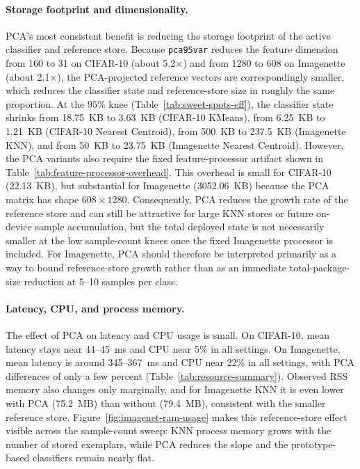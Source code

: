 \documentclass[sigconf,review,nonacm]{acmart}
\begin{document}
\paragraph{Storage footprint and dimensionality.}
PCA's most consistent benefit is reducing the storage footprint of the active classifier and reference store.
Because \texttt{pca95var} reduces the feature dimension from 160 to 31 on CIFAR-10 (about 5.2$\times$) and from 1280 to 608 on Imagenette (about 2.1$\times$), the PCA-projected reference vectors are correspondingly smaller, which reduces the classifier state and reference-store size in roughly the same proportion.
At the 95\% knee (Table~\ref{tab:sweet-spots-eff}), the classifier state shrinks from 18.75~KB to 3.63~KB (CIFAR-10 KMeans), from 6.25~KB to 1.21~KB (CIFAR-10 Nearest Centroid), from 500~KB to 237.5~KB (Imagenette KNN), and from 50~KB to 23.75~KB (Imagenette Nearest Centroid).
However, the PCA variants also require the fixed feature-processor artifact shown in Table~\ref{tab:feature-processor-overhead}.
This overhead is small for CIFAR-10 (22.13~KB), but substantial for Imagenette (3052.06~KB) because the PCA matrix has shape $608\times1280$.
Consequently, PCA reduces the growth rate of the reference store and can still be attractive for large KNN stores or future on-device sample accumulation, but the total deployed state is not necessarily smaller at the low sample-count knees once the fixed Imagenette processor is included.
For Imagenette, PCA should therefore be interpreted primarily as a way to bound reference-store growth rather than as an immediate total-package-size reduction at 5--10 samples per class.

\paragraph{Latency, CPU, and process memory.}
The effect of PCA on latency and CPU usage is small.
On CIFAR-10, mean latency stays near 44--45~ms and CPU near 5\% in all settings. On Imagenette, mean latency is around 345--367~ms and CPU near 22\% in all settings, with PCA differences of only a few percent (Table~\ref{tab:resource-summary}).
Observed RSS memory also changes only marginally, and for Imagenette KNN it is even lower with PCA (75.2~MB) than without (79.4~MB), consistent with the smaller reference store.
Figure~\ref{fig:imagenet-ram-usage} makes this reference-store effect visible across the sample-count sweep: KNN process memory grows with the number of stored exemplars, while PCA reduces the slope and the prototype-based classifiers remain nearly flat.
\end{document}
